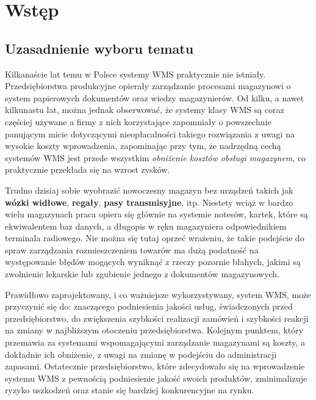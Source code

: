 \chapter{Wstęp}
\label{c1:c1}

\section{Uzasadnienie wyboru tematu}
	Kilkanaście lat temu w Polsce systemy WMS praktycznie nie istniały. Przedsiębiorstwa
	produkcyjne opierały zarządzanie procesami magazynowi o system papierowych dokumentów
	oraz wiedzy magazynierów. Od kilku, a nawet kilkunastu lat, można jednak obserwować, że
	systemy klasy WMS są coraz częściej używane a firmy z nich korzystające zapomniały 
	o powszechnie panującym micie dotyczącymi nieopłacalności takiego rozwiązania z uwagi na wysokie 
	koszty wprowadzenia, zapominając przy tym, że nadrzędną cechą systemów WMS jest
	przede wszystkim \emph{obniżenie kosztów obsługi magazynem}, co praktycznie przekłada się na wzrost 
	zysków.
	
	Trudno dzisiaj sobie wyobrazić nowoczesny magazyn bez urządzeń takich jak \textbf{wózki widłowe}, 
	\textbf{regały}, \textbf{pasy transmisyjne}, itp. Niestety wciąż w bardzo wielu magazynach praca 
	opiera się głównie na systemie notesów, kartek, które 
	są ekwiwalentem baz danych, a długopis w ręku magazyniera odpowiednikiem terminala radiowego. Nie 
	można się tutaj oprzeć wrażeniu, że takie podejście do spraw zarządzania rozmieszczeniem towarów
	ma dużą podatność na występowanie błędów mogących wyniknąć z rzeczy pozornie błahych, jakimi są
	zwolnienie lekarskie lub zgubienie jednego z dokumentów magazynowych.
	
	Prawidłowo zaprojektowany, i co ważniejsze wykorzystywany, system WMS, może przyczynić się do:
	znaczącego podniesienia jakości usług, świadczonych przed przedsiębiorstwo, do zwiększenia
	szybkości realizacji zamówień i szybkości reakcji na zmiany w najbliższym otoczeniu
	przedsiębiorstwa. Kolejnym punktem, który przemawia za systemami wspomagającymi 
	zarządzanie magazynami są koszty, a dokładnie ich obniżenie, z uwagi na zmianę w podejściu 
	do administracji zapasami. Ostatecznie przedsiębiorstwo, które zdecydowało się na wprowadzenie
	systemu WMS z pewnością podniesienie jakość swoich produktów, zminimalizuje ryzyko
	uszkodzeń oraz stanie się bardziej konkurencyjne na rynku.
	\pagebreak	
